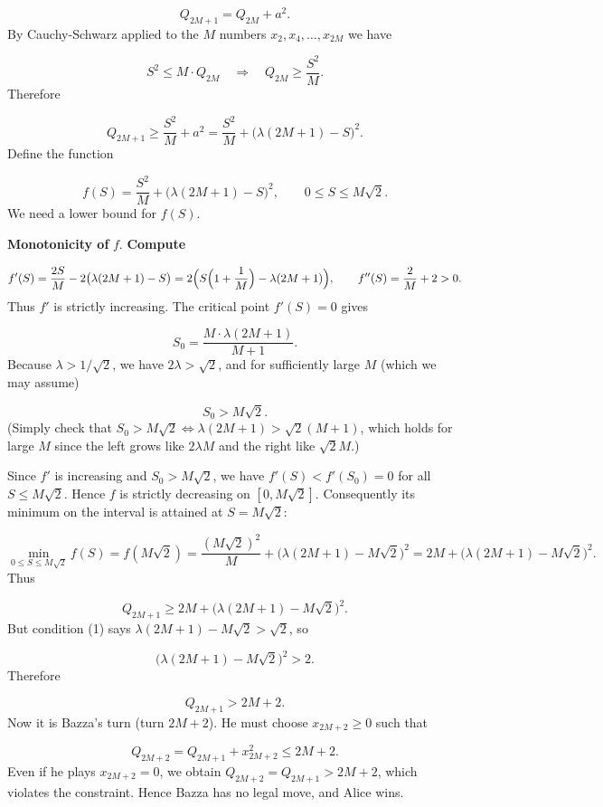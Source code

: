 \documentclass{llmxive}
\begin{document}
\[
Q_{2M+1} = Q_{2M} + a^2.
\]
By Cauchy-Schwarz applied to the \(M\) numbers \(x_2,x_4,\dots,x_{2M}\) we have\par
\[
S^2 \le M\cdot Q_{2M} \quad\Longrightarrow\quad Q_{2M} \ge \frac{S^2}{M}.
\]
Therefore\par
\[
Q_{2M+1} \ge \frac{S^2}{M} + a^2 = \frac{S^2}{M} + \bigl(\lambda(2M+1)-S\bigr)^2.
\]
Define the function\par
\[
f(S) = \frac{S^2}{M} + \bigl(\lambda(2M+1)-S\bigr)^2, \qquad 0\le S\le M\sqrt{2}.
\]
We need a lower bound for \(f(S)\).\par
\textbf{Monotonicity of }\(f\).\textbf{ Compute}\par
\[
f'(S) = \frac{2S}{M} - 2\bigl(\lambda(2M+1)-S\bigr) = 2\Bigl( S\Bigl(1+\frac{1}{M}\Bigr) - \lambda(2M+1)\Bigr), \qquad f''(S)=\frac{2}{M}+2>0.
\]
Thus \(f'\) is strictly increasing. The critical point \(f'(S)=0\) gives\par
\[
S_0 = \frac{M\cdot \lambda(2M+1)}{M+1}.
\]
Because \(\lambda > 1/\sqrt{2}\), we have \(2\lambda > \sqrt{2}\), and for sufficiently large \(M\) (which we may assume)\par
\[
S_0 > M\sqrt{2}.
\]
(Simply check that \(S_0 > M\sqrt{2} \iff \lambda(2M+1) > \sqrt{2}(M+1)\), which holds for large \(M\) since the left grows like \(2\lambda M\) and the right like \(\sqrt{2} M\).)\par
Since \(f'\) is increasing and \(S_0 > M\sqrt{2}\), we have \(f'(S) < f'(S_0)=0\) for all \(S\le M\sqrt{2}\). Hence \(f\) is strictly decreasing on \([0,M\sqrt{2}]\). Consequently its minimum on the interval is attained at \(S = M\sqrt{2}\):\par
\[
\min_{0\le S\le M\sqrt{2}} f(S) = f(M\sqrt{2}) = \frac{(M\sqrt{2})^2}{M} + \bigl(\lambda(2M+1)-M\sqrt{2}\bigr)^2 = 2M + \bigl(\lambda(2M+1)-M\sqrt{2}\bigr)^2.
\]
Thus\par
\[
Q_{2M+1} \ge 2M + \bigl(\lambda(2M+1)-M\sqrt{2}\bigr)^2.
\]
But condition (1) says \(\lambda(2M+1)-M\sqrt{2} > \sqrt{2}\), so\par
\[
\bigl(\lambda(2M+1)-M\sqrt{2}\bigr)^2 > 2.
\]
Therefore\par
\[
Q_{2M+1} > 2M + 2.
\]
Now it is Bazza's turn (turn \(2M+2\)). He must choose \(x_{2M+2}\ge 0\) such that\par
\[
Q_{2M+2} = Q_{2M+1} + x_{2M+2}^2 \le 2M+2.
\]
Even if he plays \(x_{2M+2}=0\), we obtain \(Q_{2M+2}=Q_{2M+1} > 2M+2\), which violates the constraint. Hence Bazza has no legal move, and Alice wins.\par
\smallskip
\end{document}

